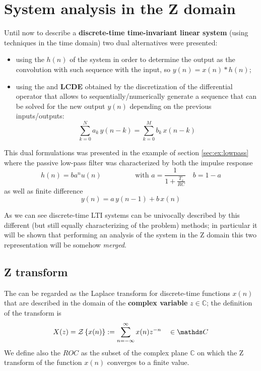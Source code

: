 \chapter{System analysis in the Z domain}
	Until now to describe a \textbf{discrete-time time-invariant linear system} (using techniques in the time domain) two dual alternatives were presented:
	\begin{itemize}
		\item using the  $h(n)$ of the system in order to determine the output as the convolution with such sequence with the input, so $y(n) =  x(n) * h(n)$;
		\item using the  and  \textbf{LCDE} obtained by the discretization of the differential operator that allows to sequentially/numerically generate a sequence that can be solved for the new output $y(n)$ depending on the previous inputs/outputs:
		\begin{equation}
			\sum_{k=0}^N a_k\, y(n-k) = \sum_{k=0}^M b_k\, x(n-k)
		\end{equation}
	\end{itemize}

	This dual formulations was presented in the example of section \ref{sec:ex:lowpass} where the passive low-pass filter was characterized by both the impulse response
	\[ h(n) = ba^n u(n) \hspace{2cm} \textrm{with } a = \frac{1}{1 + \frac{T_s}{RC}}\quad b = 1-a \]
	as well as finite difference
	\[ y(n) = a\, y(n-1) + b\, x(n) \]
	
	As we can see discrete-time LTI systems can be univocally described by this different (but still equally characterizing of the problem) methods; in particular it will be shown that performing an analysis of the system in the Z domain this two representation will be somehow \textit{merged}.
	
\section{Z transform}
	The  can be regarded as the Laplace transform for discrete-time functions $x(n)$ that are described in the domain of the \textbf{complex variable} $z\in \mathds C$; the definition of the transform is
	\begin{equation}
		X(z) = \Z{x(n)} := \infsum n x(n) z^{-n} \quad \in \mathds C
	\end{equation}
	We define also the  $ROC$ as the subset of the complex plane $\mathds C$ on which the Z transform of the function $x(n)$ converges to a finite value.
	
